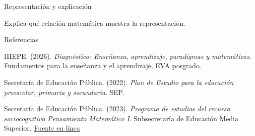 \documentclass[
	spanish,
	aspectratio=1610,
	xcolor={dvipsnames,table}
]{beamer}
\begin{document}
\begin{frame}{Representación y explicación}
\centering{}\par\vspace{.15cm}\small Explica qué relación matemática muestra la representación.
\end{frame}
\begin{frame}{Referencias}
\fontsize{9}{11}\selectfont\raggedright 
{\setlength{\parskip}{6pt}
\par\hangindent=1.27cm  IIIEPE. (2026). \textit{Diagnóstico: Enseñanza, aprendizaje, paradigmas y matemáticas}. Fundamentos para la enseñanza y el aprendizaje, EVA posgrado.
\par\hangindent=1.27cm  Secretaría de Educación Pública. (2022). \textit{Plan de Estudio para la educación preescolar, primaria y secundaria}. SEP.
\par\hangindent=1.27cm Secretaría de Educación Pública. (2023). \textit{Programa de estudios del recurso sociocognitivo Pensamiento Matemático I}. Subsecretaría de Educación Media Superior. \href{https://dgb.sep.gob.mx/storage/recursos/2025/09/nfhyrKiRiF-Pensamiento-Matematico-I.pdf}{Fuente en línea}
}


\end{frame}
\end{document}
